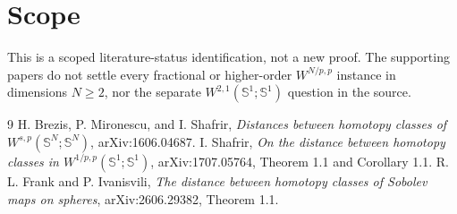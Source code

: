 \documentclass[11pt]{article}
\begin{document}
\section*{Scope}
This is a scoped literature-status identification, not a new proof. The
supporting papers do not settle every fractional or higher-order
$W^{N/p,p}$ instance in dimensions $N\ge2$, nor the separate
$W^{2,1}(\mathbb S^1;\mathbb S^1)$ question in the source.

\begin{thebibliography}{9}
H. Brezis, P. Mironescu, and I. Shafrir,
\emph{Distances between homotopy classes of $W^{s,p}(\mathbb S^N;\mathbb S^N)$},
arXiv:1606.04687.
I. Shafrir,
\emph{On the distance between homotopy classes in $W^{1/p,p}(\mathbb S^1;\mathbb S^1)$},
arXiv:1707.05764, Theorem 1.1 and Corollary 1.1.
R. L. Frank and P. Ivanisvili,
\emph{The distance between homotopy classes of Sobolev maps on spheres},
arXiv:2606.29382, Theorem 1.1.
\end{thebibliography}
\end{document}

